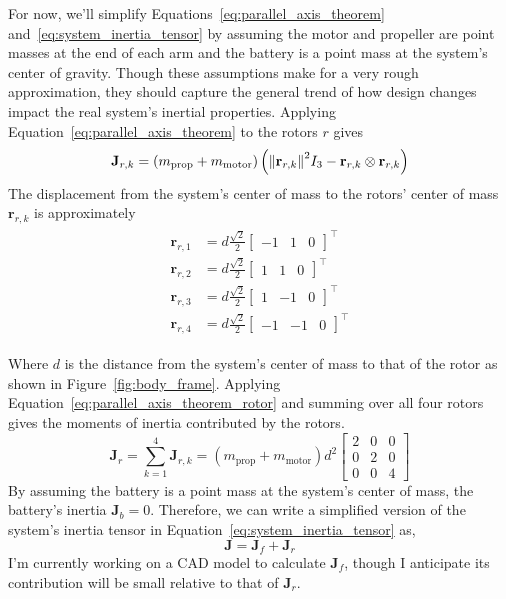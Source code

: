 \documentclass{article}
\begin{document}
		For now, we'll simplify Equations~\ref{eq:parallel_axis_theorem} and~\ref{eq:system_inertia_tensor} by assuming the motor and propeller are point masses at the end of each arm and the battery is a point mass at the system's center of gravity.  Though these assumptions make for a very rough approximation, they should capture the general trend of how design changes impact the real system's inertial properties.  Applying Equation~\ref{eq:parallel_axis_theorem} to the rotors $r$ gives
		\begin{equation}
			\mathbf{J}_{r,k} = \left(m_{\text{prop}} + m_{\text{motor}}\right) \left(\norm{\mathbf{r}_{r,k}}^2 I_3 - \mathbf{r}_{r,k} \otimes \mathbf{r}_{r,k} \right)
			\label{eq:parallel_axis_theorem_rotor}
		\end{equation}
		The displacement from the system's center of mass to the rotors' center of mass $\mathbf{r}_{r,k}$ is approximately
		\begin{align}
		\begin{split}
			\mathbf{r}_{r,1} &= d\frac{\sqrt{2}}{2}\begin{bmatrix} -1 & 1 & 0\end{bmatrix}^\top \\
			\mathbf{r}_{r,2} &= d\frac{\sqrt{2}}{2}\begin{bmatrix} 1 & 1 & 0\end{bmatrix}^\top \\
			\mathbf{r}_{r,3} &= d\frac{\sqrt{2}}{2}\begin{bmatrix} 1 & -1 & 0\end{bmatrix}^\top \\
			\mathbf{r}_{r,4} &= d\frac{\sqrt{2}}{2}\begin{bmatrix} -1 & -1 & 0\end{bmatrix}^\top
		\end{split}
		\end{align}
		
		Where $d$ is the distance from the system's center of mass to that of the rotor as shown in Figure~\ref{fig:body_frame}.  
		Applying Equation~\ref{eq:parallel_axis_theorem_rotor} and summing over all four rotors gives the moments of inertia contributed by the rotors.
		\begin{equation}
			\mathbf{J}_r = \sum_{k=1}^{4}{\mathbf{J}_{r,k}} = \left(m_{\text{prop}} + m_{\text{motor}}\right)d^2
			\begin{bmatrix}
				2 & 0 & 0 \\ 0 & 2 & 0 \\ 0 & 0 & 4
			\end{bmatrix}
		\end{equation}
		By assuming the battery is a point mass at the system's center of mass, the battery's inertia $\mathbf{J}_b = 0$. Therefore, we can write a simplified version of the system's inertia tensor in Equation~\ref{eq:system_inertia_tensor} as,
		\begin{equation}
			\mathbf{J} = \mathbf{J}_f + \mathbf{J}_r
		\end{equation}
		I'm currently working on a CAD model to calculate $\mathbf{J}_f$, though I anticipate its contribution will be small relative to that of $\mathbf{J}_r$.  
		
\end{document}
